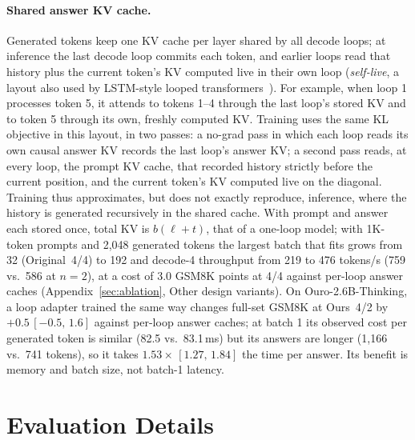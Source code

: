 \documentclass[11pt]{article}
\newcommand{\ci}[2]{\,{\scriptsize\ensuremath{[#1,\,#2]}}}
\newcommand{\rw}[2]{Ours~#1/#2}
\newcommand{\nat}[1]{Original~#1/#1}
\begin{document}
\paragraph{Shared answer KV cache.} Generated tokens keep one KV cache per layer shared by all decode loops; at inference
the last decode loop commits each token, and earlier loops read that history plus the current token's KV computed live
in their own loop (\emph{self-live}, a layout also used by LSTM-style looped transformers~\citep{lstmloop}). For
example, when loop 1 processes token 5, it attends to tokens 1--4 through the last loop's stored KV and to token 5
through its own, freshly computed KV. Training
uses the same KL objective in this layout, in two passes: a no-grad pass in which each loop reads its own causal answer KV records the last loop's answer KV; a second pass
reads, at every loop, the prompt KV cache, that recorded history strictly before the current position, and the current
token's KV computed live on the diagonal. Training thus approximates, but does not exactly reproduce, inference, where
the history is generated recursively in the shared cache. With prompt and answer each stored once, total KV is $b(\ell+t)$, that
of a one-loop model; with 1K-token prompts and 2,048 generated tokens the largest batch that fits grows from 32
(\nat{4}) to 192 and decode-4 throughput from 219 to 476 tokens/s (759 vs.\ 586 at $n{=}2$), at a cost of 3.0 GSM8K points at 4/4 against per-loop answer caches (Appendix~\ref{sec:ablation}, Other design
variants). On Ouro-2.6B-Thinking, a loop adapter
trained the same way changes full-set GSM8K at \rw{4}{2} by $+0.5$\ci{-0.5}{1.6} against per-loop answer caches; at batch 1
its observed cost per generated token is similar (82.5 vs.\ 83.1\,ms) but its answers are longer (1,166 vs.\ 741 tokens), so it
takes $1.53\times$\ci{1.27}{1.84} the time per answer. Its benefit is memory and batch size, not batch-1 latency.

\section{Evaluation Details}
\label{app:eval}
\end{document}
